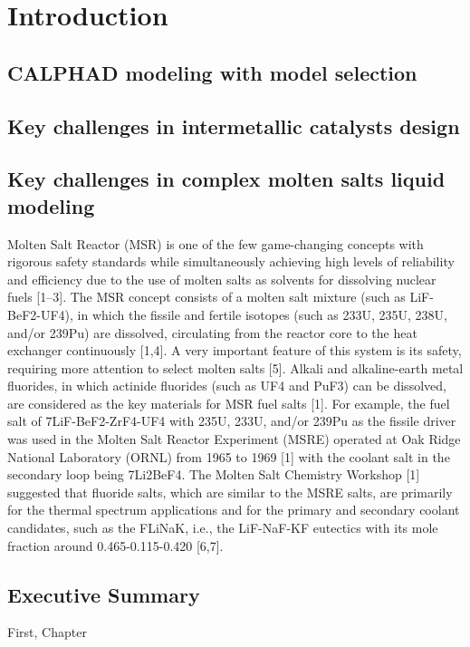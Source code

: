 \chapter{Introduction} \label{sec:Introduction}

\section{CALPHAD modeling with model selection} \label{intro:sec:calphad}


\section{Key challenges in intermetallic catalysts design} \label{intro:sec:catalysts}


\section{Key challenges in complex molten salts liquid modeling } \label{intro:sec:moltensalts}
Molten Salt Reactor (MSR) is one of the few game-changing concepts with rigorous safety standards while simultaneously achieving high levels of reliability and efficiency due to the use of molten salts as solvents for dissolving nuclear fuels [1–3]. The MSR concept consists of a molten salt mixture (such as LiF-BeF2-UF4), in which the fissile and fertile isotopes (such as 233U, 235U, 238U, and/or 239Pu) are dissolved, circulating from the reactor core to the heat exchanger continuously [1,4]. A very important feature of this system is its safety, requiring more attention to select molten salts [5]. Alkali and alkaline-earth metal fluorides, in which actinide fluorides (such as UF4 and PuF3) can be dissolved, are considered as the key materials for MSR fuel salts [1]. For example, the fuel salt of 7LiF-BeF2-ZrF4-UF4 with 235U, 233U, and/or 239Pu as the fissile driver was used in the Molten Salt Reactor Experiment (MSRE) operated at Oak Ridge National Laboratory (ORNL) from 1965 to 1969 [1] with the coolant salt in the secondary loop being 7Li2BeF4. The Molten Salt Chemistry Workshop [1] suggested that fluoride salts, which are similar to the MSRE salts, are primarily for the thermal spectrum applications and for the primary and secondary coolant candidates, such as the FLiNaK, i.e., the LiF-NaF-KF eutectics with its mole fraction around 0.465-0.115-0.420 [6,7]. 



\section{Executive Summary } \label{intro:sec:summary}

First, Chapter  

